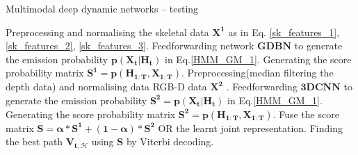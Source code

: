 \begin{algorithm}[t]
\caption{Multimodal deep dynamic networks -- testing}\label{MMDDN_test}
\LinesNumbered
\SetAlgoLined
\SetAlgoNoEnd
\DontPrintSemicolon
{}

    \SetAlgoVlined
        Preprocessing and normalising the skeletal data $ \mathbf{X^1}$  as in Eq. \ref{sk_features_1}, \ref{sk_features_2}, \ref{sk_features_3}.\;
        Feedforwarding network $\mathbf{GDBN}$ to generate the emission probability $\mathbf{p(X_t | H_t )}$ in Eq.\ref{HMM_GM_1}. \;
        Generating the score probability matrix $\mathbf{S^1 = p(H_{1:T},X_{1:T}).}$ \;
        Preprocessing(median filtering the depth data) and normalising data RGB-D data $ \mathbf{X^2}$ .\;
        Feedforwarding $\mathbf{3DCNN}$ to generate the emission probability $\mathbf{S^2 = p(X_t | H_t )}$ in Eq.\ref{HMM_GM_1}. \;
        Generating the score probability matrix $\mathbf{S^2 =p(H_{1:T},X_{1:T}).}$ \;
        Fuse the score matrix $\mathbf{S = \alpha * S^1 + (1-\alpha)* S^2}$ OR the learnt joint representation.\;
        Finding the best path $\mathbf{V_{t,\mathcal{H}}}$ using $\mathbf{S}$ by Viterbi decoding. \;
\end{algorithm}



\endinput
